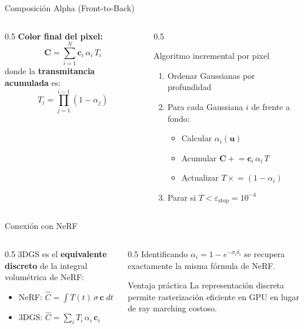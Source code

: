 \begin{frame}{Composición Alpha (Front-to-Back)}
  \begin{columns}
    \begin{column}{0.5\textwidth}
      \textbf{Color final del pixel:}
      \[
        \mathbf{C} = \sum_{i=1}^{N} \mathbf{c}_i\,\alpha_i\,T_i
      \]
      donde la \textbf{transmitancia acumulada} es:
      \[
        T_i = \prod_{j=1}^{i-1}(1 - \alpha_j)
      \]
    \end{column}
    \begin{column}{0.5\textwidth}
      \begin{block}{Algoritmo incremental por pixel}
        \begin{enumerate}
          \item Ordenar Gaussianas por profundidad
          \item Para cada Gaussiana $i$ de frente a fondo:
          \begin{itemize}
            \item Calcular $\alpha_i(\mathbf{u})$
            \item Acumular $\mathbf{C} \mathrel{+}= \mathbf{c}_i\,\alpha_i\,T$
            \item Actualizar $T \mathrel{\times}= (1 - \alpha_i)$
          \end{itemize}
          \item Parar si $T < \varepsilon_{\text{stop}} = 10^{-4}$
        \end{enumerate}
      \end{block}
    \end{column}
  \end{columns}
\end{frame}

\begin{frame}{Conexión con NeRF}
  \begin{columns}
    \begin{column}{0.5\textwidth}
      3DGS es el \textbf{equivalente discreto} de la integral volumétrica de NeRF:
      \vspace{0.5em}
      \begin{itemize}
        \item NeRF: $\hat{C} = \int T(t)\,\sigma\,\mathbf{c}\;dt$
        \item 3DGS: $\hat{C} = \sum_i T_i\,\alpha_i\,\mathbf{c}_i$
      \end{itemize}
    \end{column}
    \begin{column}{0.5\textwidth}
      Identificando $\alpha_i = 1 - e^{-\sigma_i \delta_i}$ se recupera exactamente la misma fórmula de NeRF.
      \vspace{0.5em}
      \begin{exampleblock}{Ventaja práctica}
        La representación discreta permite rasterización eficiente en GPU en lugar de ray marching costoso.
      \end{exampleblock}
    \end{column}
  \end{columns}
\end{frame}
